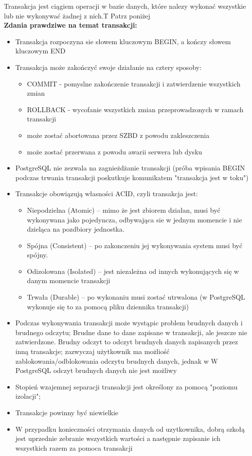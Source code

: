 {Transakcja jest ciągiem operacji w bazie danych, które nalezy wykonać wszystkie lub nie wykonywać żadnej z nich.}{T}
{Patrz poniżej}{\\}
\noindent \textbf {Zdania prawdziwe na temat transakcji:} 
\begin{itemize}
	\item Transakcja rozpoczyna sie słowem kluczowym BEGIN, a kończy słowem kluczowym END
	\item{
    	Transakcja może zakończyć swoje działanie na cztery sposoby:
    	\begin{itemize}
    		\item COMMIT - pomyslne zakończenie transakcji i zatwierdzenie wszystkich zmian
        	\item ROLLBACK - wycofanie wszystkich zmian przeprowadzonych w ramach transakcji
        	\item może zostać abortowana przez SZBD z powodu zakleszczenia
    		\item może zostać przerwana z powodu awarii serwera lub dysku
    	\end{itemize}
    } 
	\item PostgreSQL nie zezwala na zagnieżdżanie transakcji (próba wpisania BEGIN podczas trwania transakcji poskutkuje komunikatem "transakcja jest w toku")
    \item{
    	Transakcje obowiązują własności ACID, czyli transakcja jest:
    	\begin{itemize}
    		\item Niepodzielna (Atomic) – mimo że jest zbiorem działan, musi być wykonywana jako pojedyncza, odbywająca sie w jednym momencie i nie dzieląca na pozdbiory jednostka. 
        	\item Spójna (Consistent) – po zakonczeniu jej wykonywania system musi być spójny.
        	\item Odizolowana (Isolated) – jest niezależna od innych wykonujących się w danym momencie transakcji
    		\item Trwała (Durable) – po wykonaniu musi zostać utrwalona (w PostgreSQL wykonuje się to za pomocą pliku dziennika transakcji)
    	\end{itemize}
    }
    \item Podczas wykonywania transakcji może wystąpic problem brudnych danych i brudnego odczytu; Brudne dane to dane zapisane w transakcji, ale jeszcze nie zatwierdzone. Brudny odczyt to odczyt brudnych danych zapisanych przez inną transakcje; zazwyczaj użytkownik ma możliość zablokowania/odblokowania odczytu brudnych danych, jednak w W PostgreSQL odczyt brudnych danych nie jest możliwy
    \item Stopień wzajemnej separacji transakcji jest określony za pomocą "poziomu izolacji"; 
    \item Transakcje powinny być niewielkie
    \item W przypadku konieczności otrzymania danych od uzytkownika, dobrą szkołą jest uprzednie zebranie wszystkich wartości a następnie zapisanie ich wszystkich razem za pomoca transakcji
\end{itemize}
    
